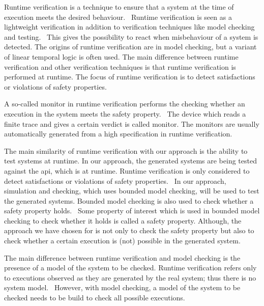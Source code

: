 Runtime verification is a technique to ensure that a system at the time of
execution meets the desired
behaviour.~\cite{leucker2009brief, havelund2008verify, falcone2009runtime}
Runtime verification is seen as a lightweight verification in addition to
verification techniques like model checking and
testing.~\cite[p.~294]{leucker2009brief} This gives the possibility to react
when misbehaviour of a system is detected. The origins of runtime verification
are in model checking, but a variant of linear temporal logic is often used.
The main difference between runtime verification and other verification
techniques is that runtime verification is performed at runtime.
The focus of runtime verification is to detect satisfactions or violations of
safety properties.~\cite{leucker2009brief, falcone2009runtime}

A so-called monitor in runtime verification performs the checking whether an
execution in the system meets the safety property.~\cite[p.~295]{leucker2009brief}
The device which reads a finite trace and gives a certain verdict is called
monitor. The monitors are usually automatically generated from a high
specification in runtime verification.~\cite{leucker2009brief, falcone2009runtime}

The main similarity of runtime verification with our approach is the ability to
test systems at runtime. In our approach, the generated systems are being tested
against the \gls{api}, which is at runtime.
Runtime verification is only considered to detect satisfactions or violations of
safety properties.~\cite{leucker2009brief, falcone2009runtime}
In our approach, simulation and checking, which uses bounded model checking,
will be used to test the generated systems. Bounded model checking is also used
to check whether a safety property holds.~\cite[p.~4]{stoel_storm_vinju_bosman_2016}
Some property of interest which is used in bounded model checking to check
whether it holds is called a safety property. Although, the approach we have
chosen for is not only to check the safety property but also to check whether a
certain execution is (not) possible in the generated system.

The main difference between runtime verification and model checking is the
presence of a model of the system to be checked.
Runtime verification refers only to executions observed as they are generated by
the real system; thus there is no system model.~\cite[p.~295]{leucker2009brief}
However, with model checking, a model of the system to be checked needs to be
build to check all possible executions.

